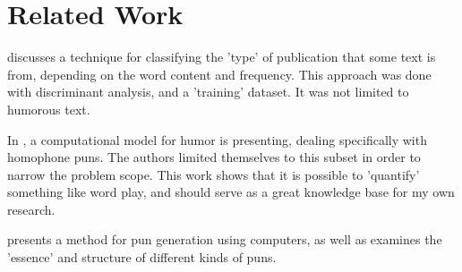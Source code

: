 \section{Related Work}

\cite{Stamatatos:2000:TGD:992730.992763} discusses a technique for classifying the 'type' of publication that some text is from, depending on the word content and frequency. This approach was done with discriminant analysis, and a 'training' dataset. It was not limited to humorous text.

In \cite{kaofunny}, a computational model for humor is presenting, dealing specifically with homophone puns. The authors limited themselves to this subset in order to narrow the problem scope. This work shows that it is possible to 'quantify' something like word play, and should serve as a great knowledge base for my own research.

\cite{ritchie2005computational} presents a method for pun generation using computers, as well as examines the 'essence' and structure of different kinds of puns.


